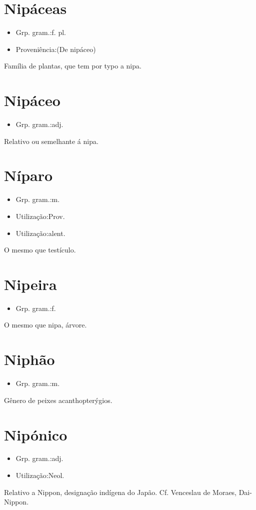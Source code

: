 \section{Nipáceas}
\begin{itemize}
\item {Grp. gram.:f. pl.}
\end{itemize}
\begin{itemize}
\item {Proveniência:(De \textunderscore nipáceo\textunderscore )}
\end{itemize}
Família de plantas, que tem por typo a nipa.
\section{Nipáceo}
\begin{itemize}
\item {Grp. gram.:adj.}
\end{itemize}
Relativo ou semelhante á nipa.
\section{Níparo}
\begin{itemize}
\item {Grp. gram.:m.}
\end{itemize}
\begin{itemize}
\item {Utilização:Prov.}
\end{itemize}
\begin{itemize}
\item {Utilização:alent.}
\end{itemize}
O mesmo que \textunderscore testículo\textunderscore .
\section{Nipeira}
\begin{itemize}
\item {Grp. gram.:f.}
\end{itemize}
O mesmo que \textunderscore nipa\textunderscore , árvore.
\section{Niphão}
\begin{itemize}
\item {Grp. gram.:m.}
\end{itemize}
Gênero de peixes acanthopterýgios.
\section{Nipónico}
\begin{itemize}
\item {Grp. gram.:adj.}
\end{itemize}
\begin{itemize}
\item {Utilização:Neol.}
\end{itemize}
Relativo a Nippon, designação indígena do Japão. Cf. Venceslau de Moraes, \textunderscore Dai-Nippon\textunderscore .
